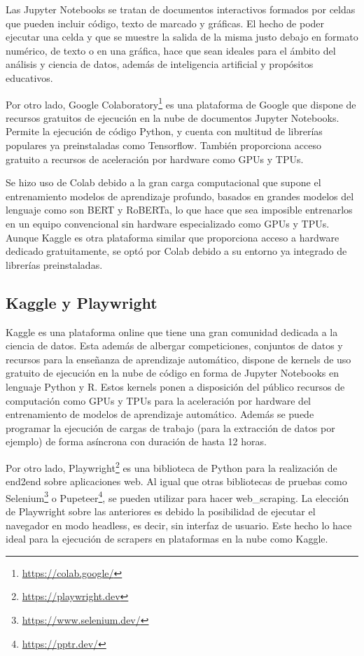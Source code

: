 Las Jupyter Notebooks se tratan de documentos interactivos formados por celdas que pueden incluir código, texto de marcado y gráficas. El hecho de poder ejecutar una celda y que se muestre la salida de la misma justo debajo en formato numérico, de texto o en una gráfica, hace que sean ideales para el ámbito del análisis y ciencia de datos, además de inteligencia artificial y propósitos educativos.

Por otro lado, Google Colaboratory\footnote{\url{https://colab.google/}} es una plataforma de Google que dispone de recursos gratuitos de ejecución en la nube de documentos Jupyter Notebooks. Permite la ejecución de código Python, y cuenta con multitud de librerías populares ya preinstaladas como Tensorflow. También proporciona acceso gratuito a recursos de aceleración por hardware como GPUs y TPUs.

Se hizo uso de Colab debido a la gran carga computacional que supone el entrenamiento modelos de aprendizaje profundo, basados en grandes modelos del lenguaje como son BERT y RoBERTa, lo que hace que sea imposible entrenarlos en un equipo convencional sin hardware especializado como GPUs y TPUs. Aunque Kaggle es otra plataforma similar que proporciona acceso a hardware dedicado gratuitamente, se optó por Colab debido a su entorno ya integrado de librerías preinstaladas.

\subsection{Kaggle y Playwright}

Kaggle es una plataforma online que tiene una gran comunidad dedicada a la ciencia de datos. Esta además de albergar competiciones, conjuntos de datos y recursos para la enseñanza de aprendizaje automático, dispone de kernels de uso gratuito de ejecución en la nube de código en forma de Jupyter Notebooks en lenguaje Python y R. Estos kernels ponen a disposición del público recursos de computación como GPUs y TPUs para la aceleración por hardware del entrenamiento de modelos de aprendizaje automático. Además se puede programar la ejecución de cargas de trabajo (para la extracción de datos por ejemplo) de forma asíncrona con duración de hasta 12 horas.

Por otro lado, Playwright\footnote{\url{https://playwright.dev}} es una biblioteca de Python para la realización de \gls{end2end} sobre aplicaciones web. Al igual que otras bibliotecas de pruebas como Selenium\footnote{\url{https://www.selenium.dev/}} o Pupeteer\footnote{\url{https://pptr.dev/}}, se pueden utilizar para hacer \gls{web_scraping}. La elección de Playwright sobre las anteriores es debido la posibilidad de ejecutar el navegador en modo headless, es decir, sin interfaz de usuario. Este hecho lo hace ideal para la ejecución de scrapers en plataformas en la nube como Kaggle.

